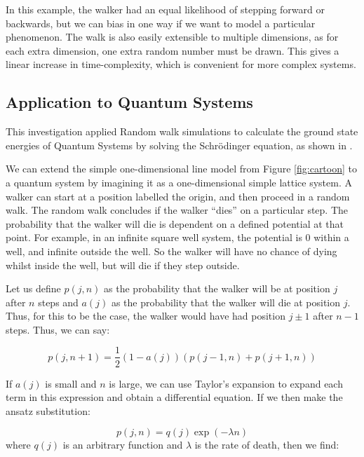 \documentclass[journal]{IEEEtran}
\begin{document}
In this example, the walker had an equal likelihood of stepping forward or
backwards, but we can bias in one way if we want to model a particular
phenomenon. The walk is also easily extensible to multiple dimensions, as for
each extra dimension, one extra random number must be drawn. This gives a linear
increase in time-complexity, which is convenient for more complex systems.

\subsection{Application to Quantum Systems}

This investigation applied Random walk simulations to calculate the ground state
energies of Quantum Systems by solving the Schr\"{o}dinger equation, as shown in
.

We can extend the simple one-dimensional line model from Figure
\ref{fig:cartoon} to a quantum system by imagining it as a one-dimensional
simple lattice system. A walker can start at a position labelled the origin, and
then proceed in a random walk. The random walk concludes if the walker ``dies''
on a particular step. The probability that the walker will die is dependent on a
defined potential at that point. For example, in an infinite square well system,
the potential is 0 within a well, and infinite outside the well. So the walker
will have no chance of dying whilst inside the well, but will die if they step
outside.

Let us define $p(j,n)$ as the probability that the walker will be at position
$j$ after $n$ steps and $a(j)$ as the probability that the walker will die at
position $j$. Thus, for this to be the case, the walker would have had position
$j\pm1$ after $n-1$ steps. Thus, we can say:

\begin{equation}
  p(j, n+1) =  \frac{1}{2}(1-a(j))(p(j-1,n) + p(j+1,n))
  \nonumber
\end{equation}

If $a(j)$ is small and $n$ is large, we can use Taylor's expansion to expand
each term in this expression and obtain a differential equation. If we then
make the ansatz substitution:

\begin{equation}
  p(j,n) = q(j) \exp(-\lambda n)
  \label{eq:firsteq}
\end{equation}
where $q(j)$ is an arbitrary function and $\lambda$ is the rate of death, then
we find:
\end{document}
